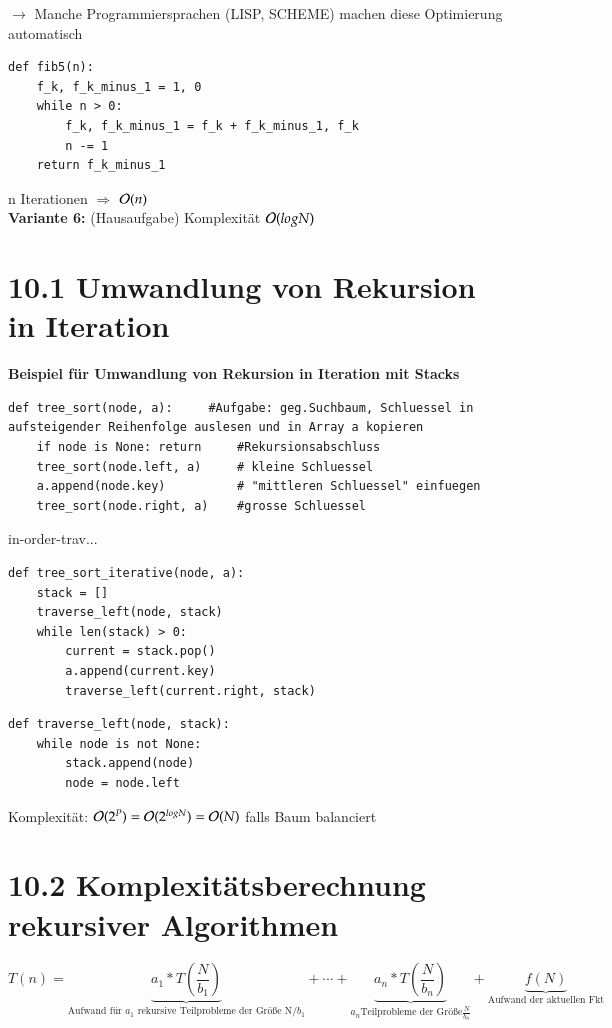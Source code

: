 $\rightarrow$ Manche Programmiersprachen (LISP, SCHEME) machen diese Optimierung automatisch\\

\begin{verbatim}
def fib5(n):
    f_k, f_k_minus_1 = 1, 0
    while n > 0:
        f_k, f_k_minus_1 = f_k + f_k_minus_1, f_k
        n -= 1
    return f_k_minus_1
\end{verbatim}
n Iterationen $\Rightarrow$ $\mathcal{O}{}(n)$\\

\textbf{Variante 6:} (Hausaufgabe) Komplexität $\mathcal{O}{}(log N)$ \\

\section*{10.1 Umwandlung von Rekursion in Iteration}
\textbf{Beispiel für Umwandlung von Rekursion in Iteration mit Stacks}
\begin{verbatim}
def tree_sort(node, a):     #Aufgabe: geg.Suchbaum, Schluessel in aufsteigender Reihenfolge auslesen und in Array a kopieren
    if node is None: return     #Rekursionsabschluss
    tree_sort(node.left, a)     # kleine Schluessel
    a.append(node.key)          # "mittleren Schluessel" einfuegen
    tree_sort(node.right, a)    #grosse Schluessel
\end{verbatim}
in-order-trav...

\begin{verbatim}
def tree_sort_iterative(node, a):
    stack = []
    traverse_left(node, stack)
    while len(stack) > 0:
        current = stack.pop()
        a.append(current.key)
        traverse_left(current.right, stack)
\end{verbatim}
\begin{verbatim}
def traverse_left(node, stack):
    while node is not None:
        stack.append(node)
        node = node.left
\end{verbatim}

Komplexität: $\mathcal{O}{}(2^P) = \mathcal{O}{}(2^{log N}) = \mathcal{O}{}(N)$ falls Baum balanciert \\

\section*{10.2 Komplexitätsberechnung rekursiver Algorithmen}
\[ T(n) = \underbrace{a_1 * T\left(\frac{N}{b_1}\right)}_{\text{Aufwand für $a_1$ rekursive Teilprobleme der Größe N/$b_1$}} + \cdots + \underbrace{a_n* T\left(\frac{N}{b_n}\right)}_{a_n \text{Teilprobleme der Größe} \frac{N}{b_n}} + \underbrace{f(N)}_{\text{Aufwand der aktuellen Fkt}}\]

